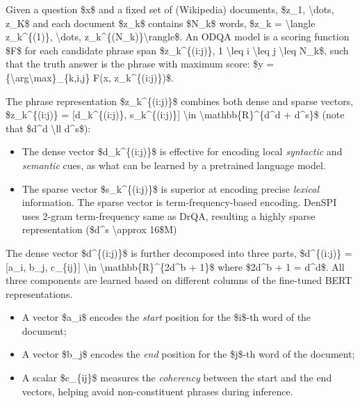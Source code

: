 Given a question \$x\$ and a fixed set of (Wikipedia) documents, \$z\_1, \textbackslash dots, z\_K\$ and each document \$z\_k\$ contains \$N\_k\$ words, \$z\_k = \textbackslash langle z\_k\^{}\{(1)\}, \textbackslash dots, z\_k\^{}\{(N\_k)\}\textbackslash rangle\$. An ODQA model is a scoring function \$F\$ for each candidate phrase span \$z\_k\^{}\{(i:j)\}, 1 \textbackslash leq i \textbackslash leq j \textbackslash leq N\_k\$, such that the truth answer is the phrase with maximum score: \$y = \{\textbackslash arg\textbackslash max\}\_\{k,i,j\} F(x, z\_k\^{}\{(i:j)\})\$.

The phrase representation \$z\_k\^{}\{(i:j)\}\$ combines both dense and sparse vectors, \$z\_k\^{}\{(i:j)\} = {[}d\_k\^{}\{(i:j)\}, s\_k\^{}\{(i:j)\}{]} \textbackslash in \textbackslash mathbb\{R\}\^{}\{d\^{}d + d\^{}s\}\$ (note that \$d\^{}d \textbackslash ll d\^{}s\$):

\begin{itemize}
\tightlist
\item
  The dense vector \$d\_k\^{}\{(i:j)\}\$ is effective for encoding local \emph{syntactic} and \emph{semantic} cues, as what can be learned by a pretrained language model.
\item
  The sparse vector \$s\_k\^{}\{(i:j)\}\$ is superior at encoding precise \emph{lexical} information. The sparse vector is term-frequency-based encoding. DenSPI uses 2-gram term-frequency same as DrQA, resulting a highly sparse representation (\$d\^{}s \textbackslash approx 16\$M)
\end{itemize}

The dense vector \$d\^{}\{(i:j)\}\$ is further decomposed into three parts, \$d\^{}\{(i:j)\} = {[}a\_i, b\_j, c\_\{ij\}{]} \textbackslash in \textbackslash mathbb\{R\}\^{}\{2d\^{}b + 1\}\$ where \$2d\^{}b + 1 = d\^{}d\$. All three components are learned based on different columns of the fine-tuned BERT representations.

\begin{itemize}
\tightlist
\item
  A vector \$a\_i\$ encodes the \emph{start} position for the \$i\$-th word of the document;
\item
  A vector \$b\_j\$ encodes the \emph{end} position for the \$j\$-th word of the document;
\item
  A scalar \$c\_\{ij\}\$ measures the \emph{coherency} between the start and the end vectors, helping avoid non-constituent phrases during inference.
\end{itemize}

